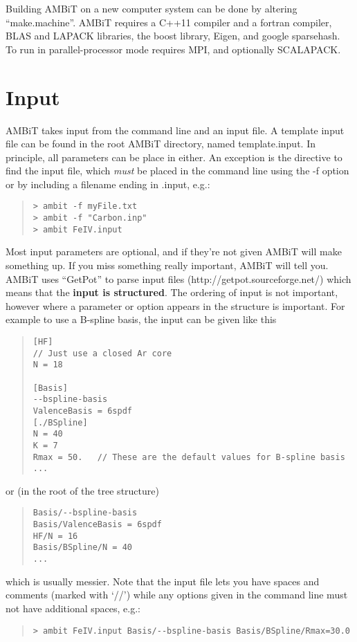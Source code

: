 \documentclass[a4paper,11pt]{article}
\begin{document}
Building AMBiT on a new computer system can be done by altering ``make.machine''. AMBiT requires a C++11 compiler and a fortran compiler, BLAS and LAPACK libraries, the boost library, Eigen, and google sparsehash. To run in parallel-processor mode requires MPI, and optionally SCALAPACK.

\section{Input}

AMBiT takes input from the command line and an input file. A template input file can be found in the root AMBiT directory, named template.input. In principle, all parameters can be place in either. An exception is the directive to find the input file, which \emph{must} be placed in the command line using the -f option or by including a filename ending in .input, e.g.:
\begin{quote}
\begin{verbatim}
> ambit -f myFile.txt
> ambit -f "Carbon.inp"
> ambit FeIV.input
\end{verbatim}
\end{quote}

Most input parameters are optional, and if they're not given AMBiT will make something up. If you miss something really important, AMBiT will tell you. AMBiT uses ``GetPot'' to parse input files (http://getpot.sourceforge.net/) which means that the \textbf{input is structured}. The ordering of input is not important, however where a parameter or option appears in the structure is important. For example to use a B-spline basis, the input can be given like this
\begin{quote}
\begin{verbatim}
[HF]
// Just use a closed Ar core
N = 18

[Basis]
--bspline-basis
ValenceBasis = 6spdf
[./BSpline]
N = 40
K = 7
Rmax = 50.   // These are the default values for B-spline basis
...
\end{verbatim}
\end{quote}
or (in the root of the tree structure)
\begin{quote}
\begin{verbatim}
Basis/--bspline-basis
Basis/ValenceBasis = 6spdf
HF/N = 16
Basis/BSpline/N = 40
...
\end{verbatim}
\end{quote}
which is usually messier.
Note that the input file lets you have spaces and comments (marked with `//') while any options given in the command line must not have additional spaces, e.g.:
\begin{quote}
\begin{verbatim}
> ambit FeIV.input Basis/--bspline-basis Basis/BSpline/Rmax=30.0
\end{verbatim}
\end{quote}
\end{document}
